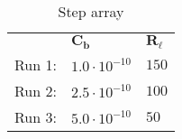 \begin{table}[H]
\centering
\begin{tabular}[c]{lll}
\textbf{ } & $\mathbf{C_{b}}$ & $\mathbf{R_{\ell}}$ \\ 
\rowcolor{myyellow}
\small{Run 1:} &$1.0 \cdot 10^{-10}$ &$150$ \\ 
\small{Run 2:} &$2.5 \cdot 10^{-10}$ &$100$ \\ 
\rowcolor{myyellow}
\small{Run 3:} &$5.0 \cdot 10^{-10}$ &$50$ \\ 
\end{tabular}
\caption{Step array}
\label{tab-stepdict}
\end{table}

